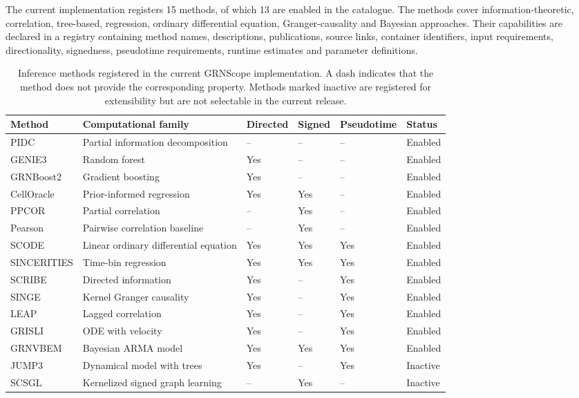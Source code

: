 \documentclass[unnumsec,webpdf,modern,large]{oup-authoring-template}%
\begin{document}
The current implementation registers 15 methods, of which 13 are enabled in the catalogue. The methods cover information-theoretic, correlation, tree-based, regression, ordinary differential equation, Granger-causality and Bayesian approaches. Their capabilities are declared in a registry containing method names, descriptions, publications, source links, container identifiers, input requirements, directionality, signedness, pseudotime requirements, runtime estimates and parameter definitions.

\begin{table}[t]
\centering
\caption{Inference methods registered in the current GRNScope implementation. A dash indicates that the method does not provide the corresponding property. Methods marked inactive are registered for extensibility but are not selectable in the current release.}
\label{tab:methods}
\begin{tabular}{llllll}
\toprule
Method & Computational family & Directed & Signed & Pseudotime & Status \\
\midrule
PIDC & Partial information decomposition & -- & -- & -- & Enabled \\
GENIE3 & Random forest & Yes & -- & -- & Enabled \\
GRNBoost2 & Gradient boosting & Yes & -- & -- & Enabled \\
CellOracle & Prior-informed regression & Yes & Yes & -- & Enabled \\
PPCOR & Partial correlation & -- & Yes & -- & Enabled \\
Pearson & Pairwise correlation baseline & -- & Yes & -- & Enabled \\
SCODE & Linear ordinary differential equation & Yes & Yes & Yes & Enabled \\
SINCERITIES & Time-bin regression & Yes & Yes & Yes & Enabled \\
SCRIBE & Directed information & Yes & -- & Yes & Enabled \\
SINGE & Kernel Granger causality & Yes & -- & Yes & Enabled \\
LEAP & Lagged correlation & Yes & -- & Yes & Enabled \\
GRISLI & ODE with velocity & Yes & -- & Yes & Enabled \\
GRNVBEM & Bayesian ARMA model & Yes & Yes & Yes & Enabled \\
JUMP3 & Dynamical model with trees & Yes & -- & Yes & Inactive \\
SCSGL & Kernelized signed graph learning & -- & Yes & -- & Inactive \\
\bottomrule
\end{tabular}
\end{table}
\end{document}
